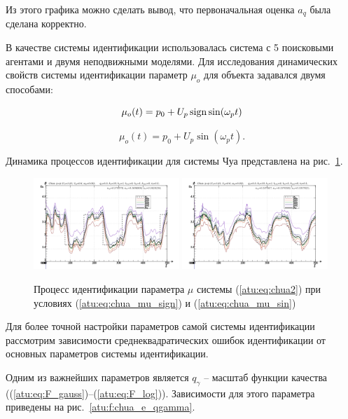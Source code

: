 Из этого графика можно сделать вывод, что первоначальная оценка $a_q$
была сделана корректно.

В качестве системы идентификации использовалась система с 5 поисковыми агентами и
двумя неподвижными моделями. Для исследования динамических свойств системы идентификации
параметр $\mu_o$ для объекта задавался двумя способами:

\begin{equation}
 \mu_o(t) = p_0 + U_p \operatorname*{sign} \sin( \omega_p t )
  \label{atu:eq:chua_mu_sign}
\end{equation}

\begin{equation}
 \mu_o(t) = p_0 + U_p \sin( \omega_p t ).
  \label{atu:eq:chua_mu_sin}
\end{equation}

Динамика процессов идентификации для системы Чуа представлена на рис.~\ref{atu:f:chua_id}.


\begin{figure}[htb!]
\centerline{
  \includegraphics[width=0.49\textwidth]{p/cha/chua/chua_m5p-pl_n_sign.png}
  \includegraphics[width=0.49\textwidth]{p/cha/chua/chua_m5p-pl_n_sin.png}
}
\caption{Процесс идентификации параметра $\mu$ системы (\ref{atu:eq:chua2})
  при условиях (\ref{atu:eq:chua_mu_sign}) и (\ref{atu:eq:chua_mu_sin})
}
\label{atu:f:chua_id}
\end{figure}

Для более точной настройки параметров самой системы идентификации
рассмотрим зависимости среднеквадратических ошибок идентификации
от основных параметров системы идентификации.

Одним из важнейших параметров является $q_\gamma$ -- масштаб функции качества
((\ref{atu:eq:F_gauss})--(\ref{atu:eq:F_log})).
Зависимости для этого параметра приведены на рис.~\ref{atu:f:chua_e_qgamma}.

